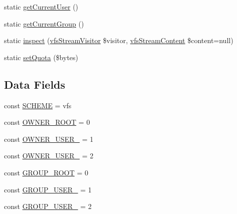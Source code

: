 \begin{DoxyCompactItemize}
\item 
static \mbox{\hyperlink{classorg_1_1bovigo_1_1vfs_1_1vfs_stream_abe39ee9bd8c9467fd15bdd3da6528f3d}{get\+Current\+User}} ()
\item 
static \mbox{\hyperlink{classorg_1_1bovigo_1_1vfs_1_1vfs_stream_a09678fb3b1dbabc33026c00b56fd52eb}{get\+Current\+Group}} ()
\item 
static \mbox{\hyperlink{classorg_1_1bovigo_1_1vfs_1_1vfs_stream_ae1d0536a1c4b5bf8169549379d0bcf90}{inspect}} (\mbox{\hyperlink{interfaceorg_1_1bovigo_1_1vfs_1_1visitor_1_1vfs_stream_visitor}{vfs\+Stream\+Visitor}} \$visitor, \mbox{\hyperlink{interfaceorg_1_1bovigo_1_1vfs_1_1vfs_stream_content}{vfs\+Stream\+Content}} \$content=null)
\item 
static \mbox{\hyperlink{classorg_1_1bovigo_1_1vfs_1_1vfs_stream_a27c55f279310a27369fb046c2b7f51f2}{set\+Quota}} (\$bytes)
\end{DoxyCompactItemize}
\subsection*{Data Fields}
\begin{DoxyCompactItemize}
\item 
const \mbox{\hyperlink{classorg_1_1bovigo_1_1vfs_1_1vfs_stream_acd5618ad381307733a7b905783529c28}{S\+C\+H\+E\+ME}} = \textquotesingle{}vfs\textquotesingle{}
\item 
const \mbox{\hyperlink{classorg_1_1bovigo_1_1vfs_1_1vfs_stream_a69cca9841133f0eea6743361796ee169}{O\+W\+N\+E\+R\+\_\+\+R\+O\+OT}} = 0
\item 
const \mbox{\hyperlink{classorg_1_1bovigo_1_1vfs_1_1vfs_stream_acdd2be9ffc0243db56c5da2e6a7c93af}{O\+W\+N\+E\+R\+\_\+\+U\+S\+E\+R\+\_}} = 1
\item 
const \mbox{\hyperlink{classorg_1_1bovigo_1_1vfs_1_1vfs_stream_a998f1e93d3b3ae5f716964299424062e}{O\+W\+N\+E\+R\+\_\+\+U\+S\+E\+R\+\_}} = 2
\item 
const \mbox{\hyperlink{classorg_1_1bovigo_1_1vfs_1_1vfs_stream_a9fd29be03d9645717db74b902a1f0058}{G\+R\+O\+U\+P\+\_\+\+R\+O\+OT}} = 0
\item 
const \mbox{\hyperlink{classorg_1_1bovigo_1_1vfs_1_1vfs_stream_abab4ea411784f30cb4e0bd2bf4f4724b}{G\+R\+O\+U\+P\+\_\+\+U\+S\+E\+R\+\_}} = 1
\item 
const \mbox{\hyperlink{classorg_1_1bovigo_1_1vfs_1_1vfs_stream_a89bd20cdc22672ef937bde73a5263a57}{G\+R\+O\+U\+P\+\_\+\+U\+S\+E\+R\+\_}} = 2
\end{DoxyCompactItemize}
